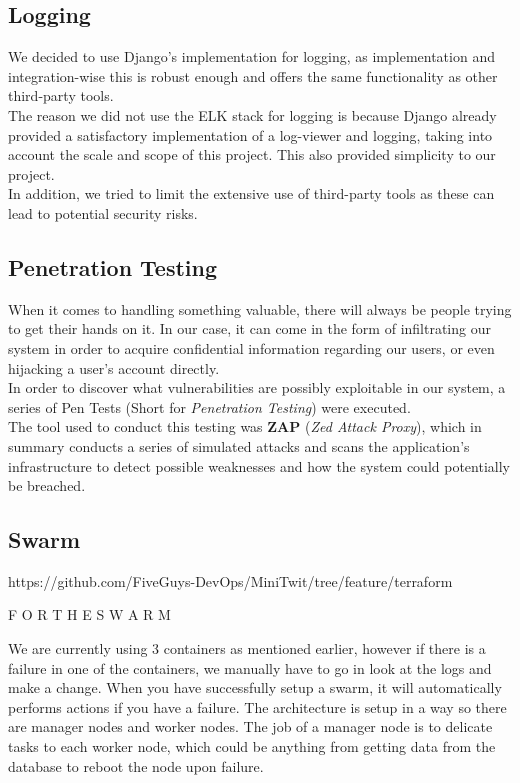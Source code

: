 \subsection*{Logging}
We decided to use Django's implementation for logging, as implementation and integration-wise this is robust enough and offers the same functionality as other third-party tools.\\
The reason we did not use the ELK stack for logging is because Django already provided a satisfactory implementation of a log-viewer and logging, taking into account the scale and scope of this project. This also provided simplicity to our project.\\
In addition, we tried to limit the extensive use of third-party tools as these can lead to potential security risks.

\subsection*{Penetration Testing}

When it comes to handling something valuable, there will always be people trying to get their hands on it.
In our case, it can come in the form of infiltrating our system in order to acquire confidential information regarding our users, or even hijacking a user's account directly.
\\
In order to discover what vulnerabilities are possibly exploitable in our system, a series of Pen Tests (Short for \textit{Penetration Testing}) were executed.
\\
The tool used to conduct this testing was \textbf{ZAP} (\textit{Zed Attack Proxy}), which in summary conducts a series of simulated attacks and scans the application's infrastructure to detect possible weaknesses and how the system could potentially be breached.

\subsection*{Swarm}
https://github.com/FiveGuys-DevOps/MiniTwit/tree/feature/terraform

F O R   T H E   S W A R M


We are currently using 3 containers as mentioned earlier, however if there is a failure in one of the containers, we manually have to go in look at the logs and make a change. When you have successfully setup a swarm, it will automatically performs actions if you have a failure. The architecture is setup in a way so there are manager nodes and worker nodes. The job of a manager node is to delicate tasks to each worker node, which could be anything from getting data from the database to reboot the node upon failure.



